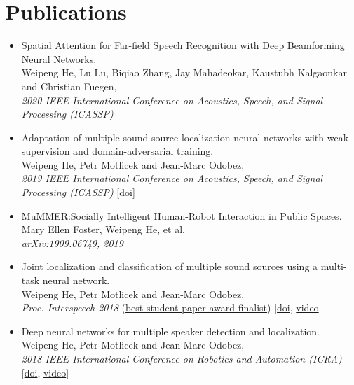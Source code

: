 \documentclass[a4paper,9pt]{article} %
\begin{document}
\section{Publications}
\begin{itemize}
  \item Spatial Attention for Far-field Speech Recognition with Deep Beamforming Neural Networks. \\
        Weipeng He, Lu Lu, Biqiao Zhang, Jay Mahadeokar, Kaustubh Kalgaonkar and Christian Fuegen, \\
        \textit{2020 IEEE International Conference on Acoustics, Speech, and Signal Processing (ICASSP)}

  \item Adaptation of multiple sound source localization neural networks with weak supervision and domain-adversarial training. \\
        Weipeng He, Petr Motlicek and Jean-Marc Odobez, \\
        \textit{2019 IEEE International Conference on Acoustics, Speech, and Signal Processing (ICASSP)}
        [\href{https://doi.org/10.1109/ICASSP.2019.8682655}{doi}]

  \item MuMMER:\@ Socially Intelligent Human-Robot Interaction in Public Spaces. \\
        Mary Ellen Foster, Weipeng He, et al. \\
        \textit{arXiv:1909.06749, 2019}

  \item Joint localization and classification of multiple sound sources using a multi-task neural network. \\
        Weipeng He, Petr Motlicek and Jean-Marc Odobez, \\
        \textit{Proc. Interspeech 2018}
        (\ul{best student paper award finalist})
        [\href{http://doi.org/10.21437/Interspeech.2018-1269}{doi}, \href{https://www.youtube.com/watch?v=O7bQvg03RTc}{video}]

  \item Deep neural networks for multiple speaker detection and localization. \\
        Weipeng He, Petr Motlicek and Jean-Marc Odobez, \\
        \textit{2018 IEEE International Conference on Robotics and Automation (ICRA)}
        [\href{http://doi.org/10.1109/ICRA.2018.8461267}{doi}, \href{https://www.youtube.com/watch?v=_4EwuVlE_pU}{video}]


\end{itemize}
\end{document}
